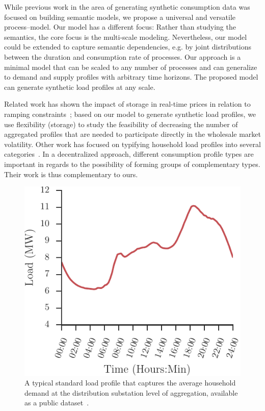 \documentclass[conference]{IEEEtran}
\begin{document}
While previous work in the area of generating synthetic consumption data was focused on building semantic models, we propose a universal and versatile process--model. Our model has a different focus: Rather than studying the semantics, the core focus is the multi-scale modeling. Nevertheless, our model could be extended to capture semantic dependencies, e.g.  by joint distributions between the duration and consumption rate of processes. Our approach is a minimal model that can be scaled to any number of processes and can generalize to demand and supply profiles with arbitrary time horizons. The proposed model can generate synthetic load profiles at any scale.

Related work has shown the impact of storage in real-time prices in relation to ramping constraints~\cite{gast2013impact}; based on our model to generate synthetic load profiles, we use flexibility (storage) to study the feasibility of decreasing the number of aggregated profiles that are needed to participate directly in the wholesale market volatility.
Other work has focused on typifying household load profiles into several categories~\cite{flath2012cluster,hayn2014electricity}. In a decentralized approach, different consumption profile types are important in regards to the possibility of forming groups of complementary types. Their work is thus complementary to ours.

\begin{figure}[t!]
\centering
\includegraphics[width=0.7\columnwidth]{figures/slp.pdf}
\caption{A typical standard load profile that captures the average household demand at the distribution substation level of aggregation, available as a public dataset~\cite{SLPsource}.}
\label{fig:slp}
\vspace{-0.5cm}
\end{figure}
\end{document}
